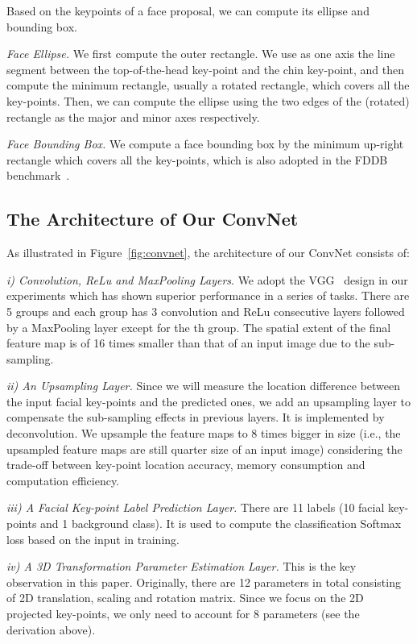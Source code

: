 \documentclass[runningheads]{llncs}
\begin{document}
Based on the keypoints of a face proposal, we can compute its ellipse and bounding box. 

\textit{Face Ellipse.} We first compute the outer rectangle. We use as one axis the line segment between the top-of-the-head key-point and the chin key-point, and then compute the minimum rectangle, usually a rotated rectangle, which covers all the key-points. Then, we can compute the ellipse using the two edges of the (rotated) rectangle as the major and minor axes respectively. 

\textit{Face Bounding Box.} We compute a face bounding box by the minimum up-right rectangle which covers all the key-points, which is also adopted in the FDDB benchmark~\cite{FDDB}.

\subsection{The Architecture of Our ConvNet}\label{sec:architecture}
As illustrated in Figure~\ref{fig:convnet}, the architecture of our ConvNet consists of:


 \textit{i) Convolution, ReLu and MaxPooling Layers}. We adopt the VGG~\cite{VGG} design in our experiments which has shown superior performance in a series of tasks. There are 5 groups and each group has 3 convolution and ReLu consecutive layers followed by a MaxPooling layer except for the th group. The spatial extent of the final feature map is of 16 times smaller than that of an input image due to the sub-sampling.

 \textit{ii) An Upsampling Layer.} Since we will measure the location difference between the input facial key-points and the predicted ones, we add an upsampling layer to compensate the sub-sampling effects in previous layers. It is implemented by deconvolution. We upsample the feature maps to 8 times bigger in size (i.e., the upsampled feature maps are still quarter size of an input image) considering the trade-off between key-point location accuracy, memory consumption and computation efficiency.

\textit{iii) A Facial Key-point Label Prediction Layer.} There are 11 labels (10 facial key-points and 1 background class). It is used to compute the classification Softmax loss based on the input in training.

\textit{iv) A 3D Transformation Parameter Estimation Layer.} This is the key observation in this paper. Originally, there are 12 parameters in total consisting of 2D translation, scaling and  rotation matrix. Since we focus on the 2D projected key-points, we only need to account for 8 parameters (see the derivation above).
\end{document}
